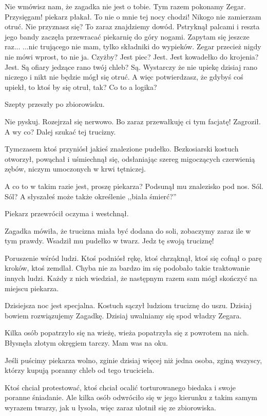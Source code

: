 \begin{dialogue}		
	\ds{} Nie wmówisz nam, że zagadka nie jest o tobie. Tym razem pokonamy Zegar.
	\ds{} Przysięgam! \dm{} 
		piekarz płakał. \dm{} 
		To nie o mnie tej nocy chodzi! Nikogo nie zamierzam otruć.
	\ds{} Nie przyznasz się? To zaraz znajdziemy dowód. \dm{} 
		Pstryknął palcami i reszta jego bandy zaczęła przewracać piekarnię do góry nogami. \ds{} 
		Zapytam się jeszcze raz...
	\ds{} ...nic trującego nie mam, tylko składniki do wypieków. Zegar przecież nigdy nie mówi wprost, to nie ja.
	\ds{} Czyżby? Jest piec? Jest. Jest kowadełko do krojenia? Jest. Są ofiary jedzące rano twój chleb? Są.
	\ds{} Wystarczy że nie upiekę dzisiaj rano niczego i nikt nie będzie mógł się otruć.
	\ds{} A więc potwierdzasz, że gdybyś coś upiekł, to ktoś by się otruł, tak?
	\ds{} Co to a logika?
\end{dialogue}
Szepty przeszły po zbiorowisku.
\begin{dialogue}
	\ds{} Nie pyskuj. \dm{} 
		Rozejrzał się nerwowo. \dm{} 
		Bo zaraz przewałkuję ci tym facjatę! \dm{} 
		Zagroził. \dm{} 
		A wy co? Dalej szukać tej trucizny.
\end{dialogue}
Tymczasem ktoś przyniósł jakieś znalezione pudełko.
Bezkosiarski kostuch otworzył, powąchał i uśmiechnął się, odsłaniając szereg migoczących czerwienią zębów, niczym umoczonych w krwi tętniczej.
\begin{dialogue}
	\ds{} A co to w takim razie jest, proszę piekarza? \dm{} Podsunął mu znalezisko pod nos.
	\ds{} Sól.
	\ds{} Sól? A słyszałeś może także określenie ,,biała śmierć?''
\end{dialogue}
Piekarz przewrócił oczyma i westchnął.
\begin{dialogue}
	\ds{} Zagadka mówiła, że trucizna miała być dodana do soli, zobaczymy zaraz ile w tym prawdy. 
		\dm{} Wsadził mu pudełko w twarz. 
		\dm{} Jedz tę swoją truciznę!
\end{dialogue}
Poruszenie wśród ludzi.
Ktoś podniósł rękę, ktoś chrząknął, ktoś się cofnął o parę kroków, ktoś zemdlał.
Chyba nie za bardzo im się podobało takie traktowanie innych ludzi. Każdy z nich wiedział, że następnym razem sam mógł skończyć na miejscu piekarza.
\begin{dialogue}
	\ds{} Dzisiejsza noc jest specjalna. 
		\dm{} Kostuch sączył ludziom truciznę do uszu. 
		\dm{} Dzisiaj bowiem rozwiązujemy Zagadkę. Dzisiaj uwalniamy się spod władzy Zegara.
\end{dialogue}
Kilka osób popatrzyło się na wieżę, wieża popatrzyła się z powrotem na nich. Błysnęła złotym okręgiem tarczy. Mam was na oku.
\begin{dialogue}
	\ds{} Jeśli puścimy piekarza wolno, zginie dzisiaj więcej niż jedna osoba, zginą wszyscy, którzy kupują poranny chleb od tego truciciela.
\end{dialogue}
Ktoś chciał protestować, ktoś chciał ocalić torturowanego biedaka i swoje poranne śniadanie.
Ale kilka osób odwróciło się w jego kierunku z takim samym wyrazem twarzy, jak u łysola, więc zaraz ulotnił się ze zbiorowiska.

